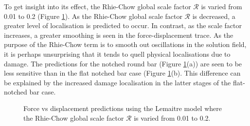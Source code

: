 \documentclass[sn-mathphys,Numbered]{sn-jnl}%
\begin{document}
To get insight into its effect, the Rhie-Chow global scale factor $\mathcal{R}$ is varied from 0.01 to 0.2 (Figure \ref{fig:vary_RC_global}).
As the Rhie-Chow global scale factor $\mathcal{R}$ is decreased, a greater level of localisation is predicted to occur.
In contrast, as the scale factor increases, a greater smoothing is seen in the force-displacement trace.
As the purpose of the Rhie-Chow term is to smooth out oscillations in the solution field, it is perhaps unsurprising that it tends to quell physical localisations due to damage.
The predictions for the notched round bar (Figure \ref{fig:vary_RC_global}(a)) are seen to be less sensitive than in the flat notched bar case (Figure \ref{fig:vary_RC_global}(b).
This difference can be explained by the increased damage localisation in the latter stages of the flat-notched bar case.
\begin{figure}[htbp]
	\centering
	\caption{Force vs displacement predictions using the Lemaitre model where the Rhie-Chow global scale factor $\mathcal{R}$ is varied from 0.01 to 0.2.}
	\label{fig:vary_RC_global}
\end{figure}
\end{document}

